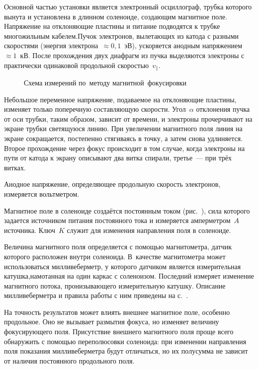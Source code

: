 \experiment Основной частью установки является электронный осциллограф, трубка
которого вынута и установлена в длинном соленоиде, создающим магнитное поле.
Напряжение на отклоняющие пластины и питание подводятся к трубке многожильным
кабелем.Пучок электронов, вылетающих из катода с разными скоростями (энергия
электрона~$\approx 0,1$~эВ), ускоряется анодным напряжением~$\approx 1$~кВ.
После прохождения двух диафрагм из пучка выделяются электроны с практически
одинаковой продольной скоростью~$v_{\parallel}$.
\begin{figure}[h!]
	\caption{ Схема измерений по~методу магнитной~фокусировки}
\end{figure}
Небольшое переменное напряжение, подаваемое на отклоняющие пластины, изменяет
только поперечную составляющую скорости. Угол~$\alpha$ отклонения пучка от оси
трубки, таким образом, зависит от времени, и электроны прочерчивают на экране
трубки светящуюся линию. При увеличении магнитного поля линия на экране
сокращается, постепенно стягиваясь в точку, а затем снова удлиняется. Второе
прохождение через фокус происходит в том случае, когда электроны на пути от
катода к экрану описывают два витка спирали, третье~--- при трёх витках.

Анодное напряжение, определяющее продольную скорость электронов, измеряется
вольтметром.

Магнитное поле в соленоиде создаётся постоянным током
(рис.~), сила которого задается источником
питания постоянного тока и измеряется амперметром~$A$ источника. Ключ~$K$
служит для изменения направления поля в соленоиде.

Величина магнитного поля определяется с помощью магнитометра, датчик которого
расположен внутри соленоида. В~качестве магнитометра  может использоваться
милливеберметр, у которого датчиком является измерительная катушка,намотанная на
один каркас с соленоизом. Последний измеряет изменение магнитного потока,
пронизывающего измерительную катушку. Описание милливеберметра и правила работы
с ним приведены на с.~\pageref{MWB}.

На точность результатов может влиять внешнее магнитное поле, особенно
продольное. Оно не вызывает размытия фокуса, но изменяет величину фокусирующего
поля. Присутствие внешнего магнитного поля проще всего обнаружить с помощью
переполюсовки соленоида: при изменении направления поля показания
милливеберметра будут отличаться, но их полусумма не зависит от наличия
постоянного продольного поля.


